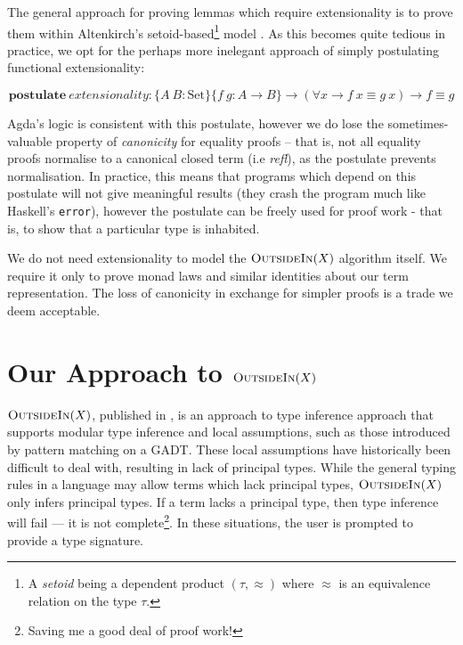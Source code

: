 \documentclass[a4paper]{jfp}
\newcommand{\outsidein}{\textsc{OutsideIn}(X)}
\begin{document}
The general approach for proving lemmas which require extensionality is to prove them within Altenkirch's setoid-based\footnote{A \emph{setoid} being a dependent product $(\tau, \approx)$ where $\approx$ is an equivalence relation on the type $\tau$.} model \cite{Altenkirch:1999:EEI:788021.788977}. As this becomes quite tedious in practice, we opt for the perhaps more inelegant approach of simply postulating functional extensionality:

\begin{displaymath}
	\textbf{postulate}\ \mathit{extensionality} : \{A\ B : \text{Set}\}\{f\ g : A \rightarrow B \} \rightarrow (\forall x \rightarrow f\ x \equiv g\ x) \rightarrow f \equiv g
\end{displaymath}

\medskip

Agda's logic is consistent with this postulate, however we do lose the sometimes-valuable property of \emph{canonicity} for equality proofs -- that is, not all equality proofs normalise to a canonical closed term (i.e \emph{refl}), as the postulate prevents normalisation. In practice, this means that programs which depend on this postulate will not give meaningful results (they crash the program much like Haskell's {\tt error}), however the postulate can be freely used for proof work - that is, to show that a particular type is inhabited.

We do not need extensionality to model the $\outsidein$ algorithm itself. We require it only to prove monad laws and similar identities about our term representation. The loss of canonicity in exchange for simpler proofs is a trade we deem acceptable.

\section{Our Approach to $\outsidein$}

$\outsidein$, published in \cite{Vytiniotis:2011:OMT:2139531.2139533}, is an approach to type inference approach that supports modular type inference and local assumptions, such as those introduced by pattern matching on a GADT\@. These local assumptions have historically been difficult to deal with, resulting in lack of principal types. While the general typing rules in a language may allow terms which lack principal types, $\outsidein$ only infers principal types. If a term lacks a principal type, then type inference will fail --- it is not complete\footnote{Saving me a good deal of proof work!}. In these situations, the user is prompted to provide a type signature.
\end{document}
